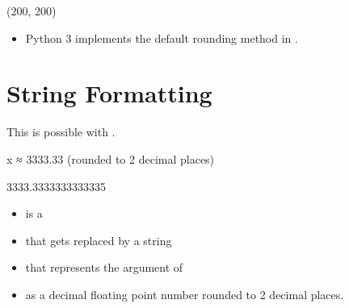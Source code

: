 \documentclass[letterpaper,10pt,english]{sphinxmanual}
\begin{document}
\begin{sphinxVerbatim}[commandchars=\\\{\}]
(200, 200)
\end{sphinxVerbatim}

\begin{itemize}
\item {} 
Python 3 implements the default rounding method in .

\end{itemize}


\section{String Formatting}
\label{\detokenize{Lecture2/Values and Variables:string-formatting}}

This is possible with .

\begin{sphinxVerbatim}[commandchars=\\\{\}]
  
\end{sphinxVerbatim}

\begin{sphinxVerbatim}[commandchars=\\\{\}]
x ≈ 3333.33 (rounded to 2 decimal places)
\end{sphinxVerbatim}

\begin{sphinxVerbatim}[commandchars=\\\{\}]
3333.3333333333335
\end{sphinxVerbatim}
\begin{itemize}
\item {} 
 is a 

\item {} 
that gets replaced by a string

\item {} 
that represents the argument  of 

\item {} 
as a decimal floating point number rounded to 2 decimal places.

\end{itemize}
\end{document}
